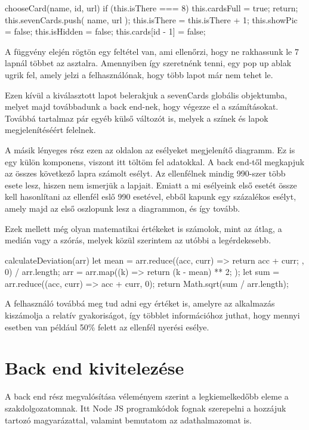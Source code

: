 \begin{python}
    chooseCard(name, id, url) {
      if (this.isThere === 8) {
        this.cardsFull = true;
        return;
      }
      this.sevenCards.push({ name, url });
      this.isThere = this.isThere + 1;
      this.showPic = false;
      this.isHidden = false;
      this.cards[id - 1] = false;
    }
\end{python}

A függvény elején rögtön egy feltétel van, ami ellenőrzi, hogy ne rakhassunk le 7 lapnál többet az asztalra. Amennyiben így szeretnénk tenni, egy pop up ablak ugrik fel, amely jelzi a felhasználónak, hogy több lapot már nem tehet le.

Ezen kívül a kiválasztott lapot belerakjuk a sevenCards globális objektumba, melyet majd továbbadunk a back end-nek, hogy végezze el a számításokat. Továbbá tartalmaz pár egyéb külső változót is, melyek a színek és lapok megjelenítéséért felelnek.

A másik lényeges rész ezen az oldalon az esélyeket megjelenítő diagramm. Ez is egy külön komponens, viszont itt töltöm fel adatokkal. A back end-től megkapjuk az összes következő lapra számolt esélyt. Az ellenfélnek mindig 990-szer több esete lesz, hiszen nem ismerjük a lapjait. Emiatt a mi esélyeink első esetét össze kell hasonlítani az ellenfél eslő 990 esetével, ebből kapunk egy százalékos esélyt, amely majd az első oszlopunk lesz a diagrammon, és így tovább. 

Ezek mellett még olyan matematikai értékeket is számolok, mint az átlag, a medián vagy a szórás, melyek közül szerintem az utóbbi a legérdekesebb.

\begin{python}
        calculateDeviation(arr) {
      let mean =
        arr.reduce((acc, curr) => {
          return acc + curr;
        }, 0) / arr.length;
      arr = arr.map((k) => {
        return (k - mean) ** 2;
      });
      let sum = arr.reduce((acc, curr) => acc + curr, 0);
      return Math.sqrt(sum / arr.length);
    }
\end{python}

A felhasználó továbbá meg tud adni egy értéket is, amelyre az alkalmazás kiszámolja a relatív gyakoriságot, így többlet információhoz juthat, hogy mennyi esetben van például 50\% felett az ellenfél nyerési esélye.

\section{Back end kivitelezése}
A back end rész megvalósítása véleményem szerint a legkiemelkedőbb eleme a szakdolgozatomnak. Itt Node JS programkódok fognak szerepelni a hozzájuk tartozó magyarázattal, valamint bemutatom az adathalmazomat is.

